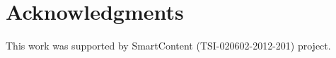 \documentclass{llncs}
\begin{document}
%


%



\vspace{-5mm}
\section*{Acknowledgments}
This work was supported by SmartContent (TSI-020602-2012-201) project.



%
\vspace{-5mm}





\clearpage
{} %
\renewcommand{\indexname}{Author Index}
\printindex \clearpage
{} %
\renewcommand{\indexname}{Subject Index}
 
\end{document}
